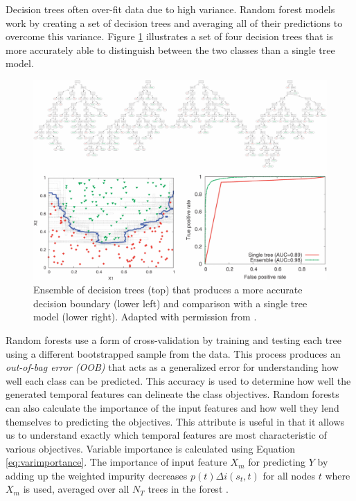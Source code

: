 Decision trees often over-fit data due to high variance. Random forest models work by creating a set of decision trees and averaging all of their predictions to overcome this variance. Figure \ref{fig:tree_ensemble} illustrates a set of four decision trees that is more accurately able to distinguish between the two classes than a single tree model.

\begin{figure}[ht!]
\begin{center}
\includegraphics[width=1\columnwidth]{figures/regressiontrees/regressiontrees}
\caption{{Ensemble of decision trees (top) that produces a more accurate decision boundary (lower left) and comparison with a single tree model (lower right). Adapted with permission from \cite{Geurts_2009}.
\label{fig:tree_ensemble}%
}}
\end{center}
\end{figure}

Random forests use a form of cross-validation by training and testing each tree using a different bootstrapped sample from the data. This process produces an \emph{out-of-bag error (OOB)} that acts as a generalized error for understanding how well each class can be predicted. This accuracy is used to determine how well the generated temporal features can delineate the class objectives. Random forests can also calculate the importance of the input features and how well they lend themselves to predicting the objectives. This attribute is useful in that it allows us to understand exactly which temporal features are most characteristic of various objectives. Variable importance is calculated using Equation \ref{eq:varimportance}. The importance of input feature $X_m$ for predicting $Y$ by adding up the weighted impurity decreases $p(t)\Delta i(s_t,t)$ for all nodes $t$ where $X_m$ is used, averaged over all $N_T$ trees in the forest \cite{louppe2013understanding}.

